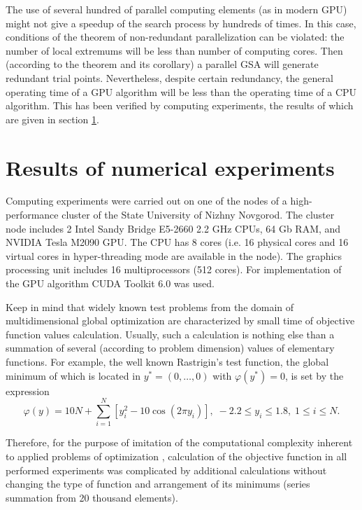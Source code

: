 \documentclass[smallcondensed]{svjour3}     %
\begin{document}
The use of several hundred of parallel computing elements (as in modern GPU) might not give a speedup of the search process by hundreds of times. In this case, conditions of the theorem of non-redundant parallelization can be violated: the number of local extremums will be less than number of computing cores. Then (according to the theorem and its corollary) a parallel GSA will generate redundant trial points. Nevertheless, despite certain redundancy, the general operating time of a GPU algorithm will be less than the operating time of a CPU algorithm. This has been verified by computing experiments, the results of which are given in section \ref{sec:6}.

\section{Results of numerical experiments} \label{sec:6}

Computing experiments were carried out on one of the nodes of a high-performance cluster of the State University of Nizhny Novgorod. The cluster node includes 2 Intel Sandy Bridge E5-2660 2.2 GHz CPUs, 64 Gb RAM, and NVIDIA Tesla M2090 GPU. The CPU has 8 cores (i.e. 16 physical cores and 16 virtual cores in hyper-threading mode are available in the node). The graphics processing unit includes 16 multiprocessors (512 cores). For implementation of the GPU algorithm CUDA Toolkit 6.0 was used.

Keep in mind that widely known test problems from the domain of multidimensional global optimization are characterized by small time of objective function values calculation. Usually, such a calculation is nothing else than a summation of several (according to problem dimension) values of elementary functions. For example, the well known Rastrigin’s test function, the global minimum of which is located in $y^\ast = (0,\dots,0)$ with $\varphi(y^\ast)=0$, is set by the expression
\begin{equation}\label{eq:33}
\varphi(y)=10N+\sum^{N}_{i=1}\left[y^2_i-10\cos(2\pi y_i)\right], \; -2.2\leq y_i \leq 1.8, \; 1\leq i \leq N.
\end{equation}

Therefore, for the purpose of imitation of the computational complexity inherent to applied problems of optimization \cite{RefBarkalov2013}, calculation of the objective function in all performed experiments was complicated by additional calculations without changing the type of function and arrangement of its minimums (series summation from 20 thousand elements).
\end{document}
